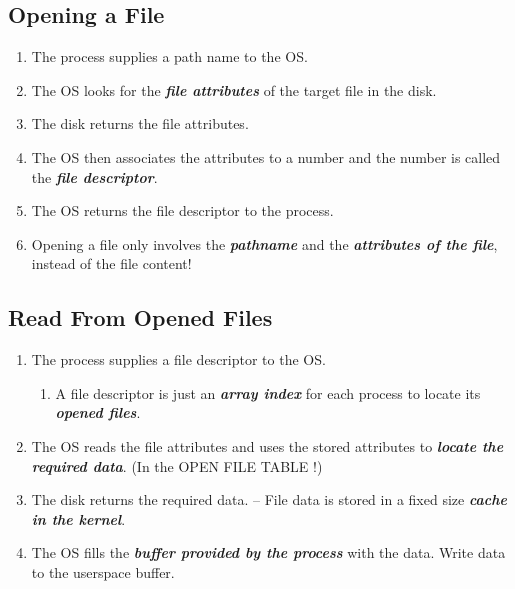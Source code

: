 \documentclass[]{report}
\renewcommand{\emph}[1]{\textbf{\textit{#1}}}
\begin{document}
		\subsection{Opening a File}
		\begin{enumerate}
			\item The process supplies a path name to the OS.
			\item The OS looks for the \emph{file attributes} of the target file in the disk.
			\item The disk returns the file attributes.
			\item The OS then associates the attributes to a number and the number is called the \emph{file descriptor}.
			\item The OS returns the file descriptor to the process.
			\item Opening a file only involves the \emph{pathname} and the \emph{attributes of the file}, instead of the file content!
		\end{enumerate}

		\subsection{Read From Opened Files}
		\begin{enumerate}
			\item The process supplies a file descriptor to the OS.
			\begin{enumerate}
				\item A file descriptor is just an \emph{array index} for each process to locate its \emph{opened files}.
			\end{enumerate}
			\item The OS reads the file attributes and uses the stored attributes to \emph{locate the required data}. (In the OPEN FILE TABLE !)
			\item The disk returns the required data. -- File data is stored in a fixed size \emph{cache in the kernel}.
			\item The OS fills the \emph{buffer provided by the process} with the data. Write data to the userspace buffer.
		\end{enumerate}
\end{document}
